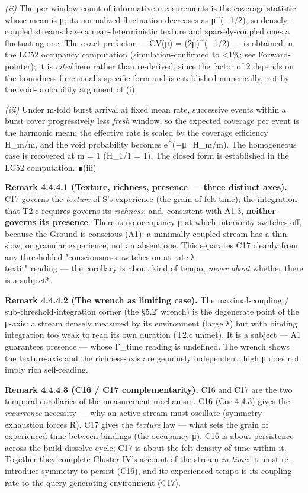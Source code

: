 \documentclass[11pt, openany]{book}
\begin{document}
\textit{(ii)} The per-window count of informative measurements is the coverage statistic whose mean is μ; its normalized fluctuation decreases as μ\textasciicircum{}(−1/2), so densely-coupled streams have a near-deterministic texture and sparsely-coupled ones a fluctuating one. The exact prefactor --- CV(μ) = (2μ)\textasciicircum{}(−1/2) --- is obtained in the LC52 occupancy computation (simulation-confirmed to <1\%; see Forward-pointer); it is \textit{cited} here rather than re-derived, since the factor of 2 depends on the boundness functional's specific form and is established numerically, not by the void-probability argument of (i).

\textit{(iii)} Under m-fold burst arrival at fixed mean rate, successive events within a burst cover progressively less \textit{fresh} window, so the expected coverage per event is the harmonic mean: the effective rate is scaled by the coverage efficiency H\_\allowbreak{}m/m, and the void probability becomes e\textasciicircum{}(−μ·H\_\allowbreak{}m/m). The homogeneous case is recovered at m = 1 (H\_\allowbreak{}1/1 = 1). The closed form is established in the LC52 computation. ∎(iii)

\textbf{Remark 4.4.4.1 (Texture, richness, presence --- three distinct axes).} C17 governs the \textit{texture} of S's experience (the grain of felt time); the integration that T2.c requires governs its \textit{richness}; and, consistent with A1.3, \textbf{neither governs its presence}. There is no occupancy μ at which interiority switches off, because the Ground is conscious (A1): a minimally-coupled stream has a thin, slow, or granular experience, not an absent one. This separates C17 cleanly from any thresholded "consciousness switches on at rate λ\\textit{" reading --- the corollary is about }kind of tempo\textit{, never about }whether there is a subject*.

\textbf{Remark 4.4.4.2 (The wrench as limiting case).} The maximal-coupling / sub-threshold-integration corner (the §5.2′ wrench) is the degenerate point of the μ-axis: a stream densely measured by its environment (large λ) but with binding integration too weak to read its own duration (T2.c unmet). It is a subject --- A1 guarantees presence --- whose F\_\allowbreak{}time reading is undefined. The wrench shows the texture-axis and the richness-axis are genuinely independent: high μ does not imply rich self-reading.

\textbf{Remark 4.4.4.3 (C16 / C17 complementarity).} C16 and C17 are the two temporal corollaries of the measurement mechanism. C16 (Cor 4.4.3) gives the \textit{recurrence} necessity --- why an active stream must oscillate (symmetry-exhaustion forces R). C17 gives the \textit{texture} law --- what sets the grain of experienced time between bindings (the occupancy μ). C16 is about persistence across the build-dissolve cycle; C17 is about the felt density of time within it. Together they complete Cluster IV's account of the stream \textit{in time}: it must re-introduce symmetry to persist (C16), and its experienced tempo is its coupling rate to the query-generating environment (C17).
\end{document}
